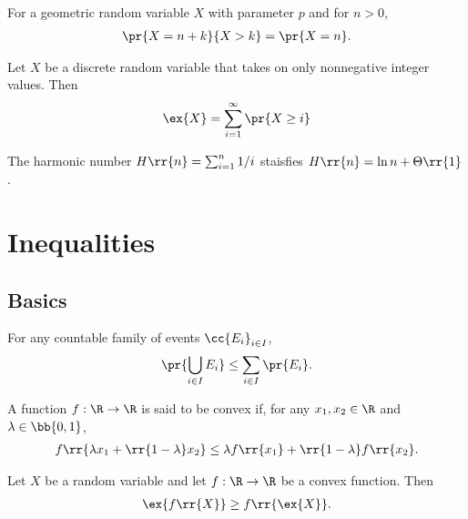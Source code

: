 \documentclass{article}
\begin{document}
\begin{lemma}
  For a geometric random variable $X$ with parameter $p$ and for $n>0$,
  \begin{align*}
    \pr{X=n+k}{X>k} = \pr{X=n}.
  \end{align*}
\end{lemma}

\begin{lemma}
  Let $X$ be a discrete random variable that takes on only nonnegative integer values. Then
  \begin{align*}
    \ex{X} = \sum_{i=1}^{\infty} \pr{X\geq i}
  \end{align*}
\end{lemma}

\begin{lemma}
  The harmonic number $H\rr{n}=\sum_{i=1}^{n} 1/i$ staisfies $H\rr{n}=\ln n+\Theta\rr{1}$.
\end{lemma}

\section{Inequalities}

\subsection{Basics}

\begin{lemma}
  For any countable family of events $\cc{E_i}_{i\in I}$,
  \begin{align*}
    \pr{\bigcup_{i\in I} E_i} \leq \sum_{i\in I} \pr{E_i}.
  \end{align*}
\end{lemma}

\begin{definition}
  \label{def:convex}
  A function $f:\R\to\R$ is said to be convex if, for any $x_1,x_2\in\R$
  and $\lambda\in\bb{0,1}$,
  \begin{align*}
    f\rr{\lambda x_1 + \rr{1-\lambda}x_2} \leq \lambda f\rr{x_1} + \rr{1-\lambda}f \rr{x_2}.
  \end{align*}
\end{definition}

\begin{theorem}
  \label{thm:jensens}
  Let $X$ be a random variable and let $f:\R\to\R$ be a convex function. Then
  \begin{align*}
    \ex{f\rr{X}} \geq f\rr{\ex{X}}.
  \end{align*}
\end{theorem}
\end{document}
